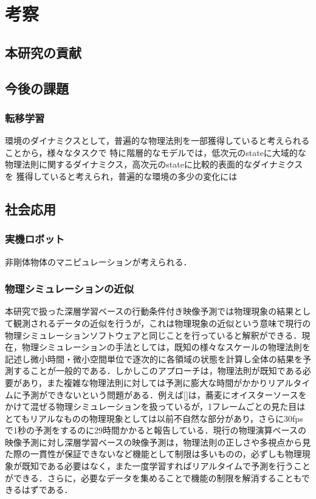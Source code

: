 \chapter{考察}
\label{chap:discussion}

\section{本研究の貢献}

\section{今後の課題}
\subsection{転移学習}
環境のダイナミクスとして，普遍的な物理法則を一部獲得していると考えられることから，様々なタスクで
特に階層的なモデルでは，低次元のstateに大域的な物理法則に関するダイナミクス，高次元のstateに比較的表面的なダイナミクスを
獲得していると考えられ，普遍的な環境の多少の変化には

\section{社会応用}
\subsection{実機ロボット}

非剛体物体のマニピュレーションが考えられる．


\subsection{物理シミュレーションの近似}
本研究で扱った深層学習ベースの行動条件付き映像予測では物理現象の結果として観測されるデータの近似を行うが，これは物理現象の近似という意味で現行の物理シミュレーションソフトウェアと同じことを行っていると解釈ができる．現在，物理シミュレーションの手法としては，既知の様々なスケールの物理法則を記述し微小時間・微小空間単位で逐次的に各領域の状態を計算し全体の結果を予測することが一般的である．しかしこのアプローチは，物理法則が既知である必要があり，また複雑な物理法則に対しては予測に膨大な時間がかかりリアルタイムに予測ができないという問題がある．例えば[]は，蕎麦にオイスターソースをかけて混ぜる物理シミュレーションを扱っているが，1フレームごとの見た目はとてもリアルなものの物理現象としては以前不自然な部分があり，さらに30fpsで1秒の予測をするのに29時間かかると報告している．現行の物理演算ベースの映像予測に対し深層学習ベースの映像予測は，物理法則の正しさや多視点から見た際の一貫性が保証できないなど機能として制限は多いものの，必ずしも物理現象が既知である必要はなく，また一度学習すればリアルタイムで予測を行うことができる．さらに，必要なデータを集めることで機能の制限を解消することもできるはずである．


